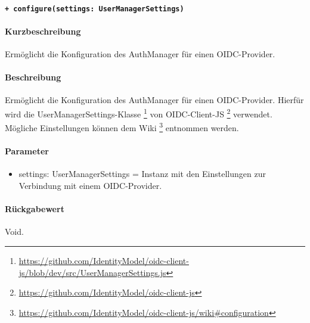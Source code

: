 \paragraph{\texttt{+ configure(settings: UserManagerSettings)}}\label{AP_AuthManager_configure}%
\paragraph*{Kurzbeschreibung}
Ermöglicht die Konfiguration des AuthManager für einen OIDC-Provider.
\paragraph*{Beschreibung}
Ermöglicht die Konfiguration des AuthManager für einen OIDC-Provider.
Hierfür wird die UserManagerSettings-Klasse \footnote{\href{https://github.com/IdentityModel/oidc-client-js/blob/dev/src/UserManagerSettings.js}{https://github.com/IdentityModel/oidc-client-js/blob/dev/src/UserManagerSettings.js}} von 
OIDC-Client-JS \footnote{\href{https://github.com/IdentityModel/oidc-client-js}{https://github.com/IdentityModel/oidc-client-js}} verwendet.
Mögliche Einstellungen können dem Wiki \footnote{\href{https://github.com/IdentityModel/oidc-client-js/wiki\#configuration}{https://github.com/IdentityModel/oidc-client-js/wiki\#configuration}} entnommen werden.
\paragraph*{Parameter}
\begin{itemize}
    \item settings: UserManagerSettings = Instanz mit den Einstellungen zur Verbindung mit einem OIDC-Provider.
\end{itemize}
\paragraph*{Rückgabewert}
Void.